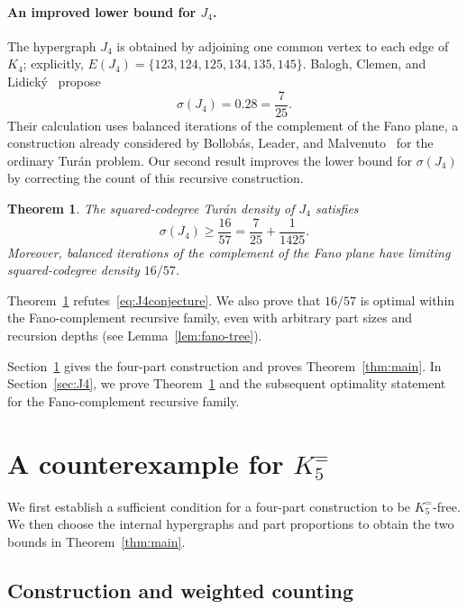\documentclass[11pt]{article}
\newtheorem{theorem}{Theorem}[section]
\theoremstyle{remark}
\numberwithin{equation}{section}
\newcommand{\F}{K_5^{=}}
\begin{document}
\paragraph{An improved lower bound for $J_4$.}
The hypergraph $J_4$ is obtained by adjoining one common vertex to each
edge of $K_4$; explicitly, $E(J_4)=\{123,124,125,134,135,145\}$.
Balogh, Clemen, and Lidick\'y~\cite[Conjecture~3.4]{BCL} propose
\begin{equation}\label{eq:J4conjecture}
 \sigma(J_4)=0.28=\frac7{25}.
\end{equation}
Their calculation uses balanced iterations of the complement of the
Fano plane, a construction already considered by Bollob\'as, Leader,
and Malvenuto~\cite{BLM} for the ordinary Tur\'an problem. Our second
result improves the lower bound for $\sigma(J_4)$ by correcting the
count of this recursive construction.

\begin{theorem}\label{thm:J4}
The squared-codegree Tur\'an density of $J_4$ satisfies
\begin{equation*}
 \sigma(J_4)\ge\frac{16}{57}=\frac7{25}+\frac1{1425}.
\end{equation*}
Moreover, balanced iterations of the complement of the Fano plane have limiting
squared-codegree density $16/57$.
\end{theorem}

Theorem~\ref{thm:J4} refutes~\eqref{eq:J4conjecture}. We also prove that
$16/57$ is optimal within the Fano-complement recursive family, even
with arbitrary part sizes and recursion depths
(see Lemma~\ref{lem:fano-tree}). 

Section~\ref{sec:K5} gives the four-part construction and proves
Theorem~\ref{thm:main}. In Section~\ref{sec:J4}, we prove
Theorem~\ref{thm:J4} and the subsequent optimality statement for the
Fano-complement recursive family.

\section{A counterexample for \texorpdfstring{$K_5^{=}$}{K5=}}\label{sec:K5}

We first establish a sufficient condition for a four-part construction
to be $\F$-free. We then choose the internal hypergraphs and part
proportions to obtain the two bounds in Theorem~\ref{thm:main}.

\subsection{Construction and weighted counting}\label{sec:construction}
\end{document}
